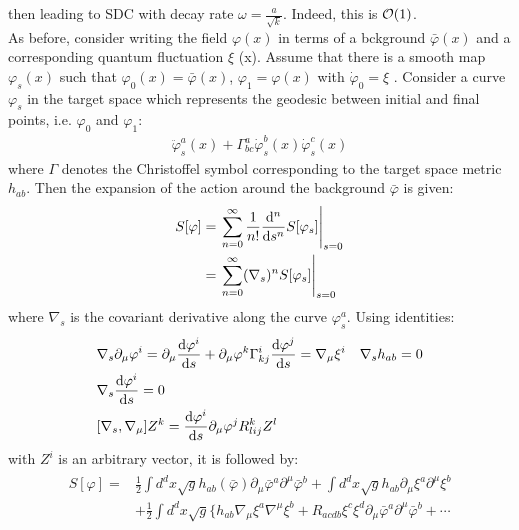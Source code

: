 then leading to SDC with decay rate $\omega = \frac{a}{\sqrt{k}}$. Indeed, this is $\order {1}$. \\
\indent As before, consider writing the field $\varphi (x)$ in terms of a bckground $\bar {\varphi} (x)$ and a corresponding quantum fluctuation $\xi$ (x). Assume that there is a smooth map $\varphi_{s} (x)$ such that $\varphi _{0} (x) = \bar{\varphi}(x)$, $\varphi_{1} = \varphi (x)$ with $\dot{\varphi} _{0} = \xi$ . Consider a curve $\varphi _{s}$ in the target space which represents the geodesic between initial and final points, i.e. $\varphi _{0}$ and $\varphi _{1}$:
\begin{align}
    \ddot{\varphi}_{s} ^{a} (x) + \Gamma _{bc}^{a} \dot{\varphi} _{s}^{b}(x) \dot{\varphi} _{s}^{c} (x)  
\end{align}
where $\Gamma$ denotes the Christoffel symbol corresponding to the target space metric $h_{ab}$. Then the expansion of the action around the background $\bar{\varphi}$ is given:
\begin{align}
    S[\varphi] &=\eval {\sum_{n=0}^{\infty} \frac{1}{n!} \dv[n] {s} S[\varphi _{s}]} _{s=0} \nonumber \\
    & = \eval {\sum_{n=0}^{\infty} (\nabla _{s})^{n} S[\varphi _{s}]} _{s=0}
\end{align}
where $\nabla _{s}$ is the covariant derivative along the curve $\varphi _{s} ^{a}$. Using identities:
\begin{align}
    &\nabla_{s} \partial _{\mu} \varphi ^{i} = \partial _{\mu} \dv{\varphi^{i}}{s} + \partial_{\mu} \varphi ^{k} \Gamma _{kj}^{i} \dv{\varphi^{j}}{s} = \nabla _{\mu} \xi ^{i} 
    & \nabla _{s} h_{ab} = 0 \\
    & \nabla _{s} \dv{\varphi ^{i}} {s} = 0 \\
    &[\nabla _{s}, \nabla _{\mu}] Z^{k} = \dv{\varphi ^{i}}{s} \partial _{\mu} \varphi ^{j} R_{lij} ^{k} Z^{l}
\end{align}
with $Z^{i}$ is an arbitrary vector, it is followed by:
\begin{align}
    \begin{split}
    S[\varphi] = & \frac{1}{2} \int d^{d}x \sqrt{g} h_{ab}(\bar{\varphi}) \partial _{\mu} \bar{\varphi}^{a} \partial ^{\mu} \bar{\varphi} ^{b} + \int d^{d}x \sqrt{g} h_{ab} \partial _{\mu} \xi ^{a} \partial ^{\mu} \xi ^{b} \\
    &+ \frac{1}{2} \int d^{d}x \sqrt{g} \lbrace h_{ab} \nabla_{\mu} \xi^{a} \nabla ^{\mu} \xi ^{b} + R_{acdb} \xi ^{c}\xi^{d} \partial _{\mu}\bar{\varphi}^{a} \partial ^{\mu} \bar{\varphi} ^{b} + \cdots
    \end{split} 
\end{align}
